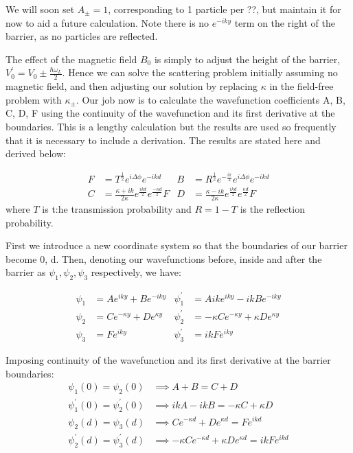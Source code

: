 \documentclass{article}
\begin{document}
We will soon set $A_{\pm} = 1$, corresponding to 1 particle per ??, but maintain it for now to aid a future calculation. Note there is no $e^{-i k y}$ term on the right of the barrier, as no particles are reflected. 

The effect of the magnetic field $B_0$ is simply to adjust the height of the barrier, $V_0^{'} = V_0 \pm \frac{\hbar \omega_L}{2}$. Hence we can solve the scattering problem initially assuming no magnetic field, and then adjusting our solution by replacing $\kappa$ in the field-free problem with $\kappa_{\pm}$. Our job now is to calculate the wavefunction coefficients A, B, C, D, F using the continuity of the wavefunction and its first derivative at the boundaries.
This is a lengthy calculation but the results are used so frequently that it is necessary to include a derivation. The results are stated here and derived below:

\begin{align}
	F &= T^{\frac{1}{2}}e^{i\Delta\phi}e^{-ikd} & B &= R^{\frac{1}{2}}e^{-\frac{i\pi}{2}}e^{i\Delta\phi}e^{-ikd} \nonumber \\
	C &= \frac{\kappa+ik}{2\kappa}e^{\frac{ikd}{2}}e^{\frac{-\kappa d}{2}}F & D &= \frac{\kappa-ik}{2\kappa}e^{\frac{ikd}{2}}e^{\frac{\kappa d}{2}}F
\end{align}
where $T$ is t:he transmission probability and $R = 1-T$ is the reflection probability.

First we introduce a new coordinate system so that the boundaries of our barrier become 0, d. Then, denoting our wavefunctions before, inside and after the barrier as $\psi_{1}, \psi_{2}, \psi_{3}$ respectively, we have:

\begin{align}
	\psi_{1} &= Ae^{iky} + Be^{-iky} & \psi_{1}^{'} &= Aike^{iky} - ikBe^{-iky} \\
	\psi_{2} &= Ce^{-\kappa y} + De^{\kappa y} & \psi_{2}^{'} &= -\kappa Ce^{-\kappa y} + \kappa De^{\kappa y} \\
	\psi_{3} &= Fe^{iky} & \psi_{3}^{'} &= ikFe^{iky}
\end{align}

Imposing continuity of the wavefunction and its first derivative at the barrier boundaries:
\begin{align}
	\psi_{1}(0) = \psi_{2}(0) &\implies A+B = C+D \\
	\psi_{1}^{'}(0) = \psi_{2}^{'}(0) &\implies ikA - ikB = -\kappa C + \kappa D \\
	\psi_{2}(d) = \psi_{3}(d) &\implies Ce^{-\kappa d} + De^{\kappa d} = Fe^{ikd} \\
	\psi_{2}^{'}(d) = \psi_{3}^{'}(d) &\implies -\kappa Ce^{-\kappa d} + \kappa De^{\kappa d} = ikF e^{ikd} 
\end{align}
\end{document}
